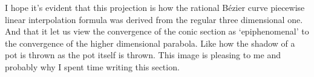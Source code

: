 I hope it's evident that this projection is how the rational Bézier curve piecewise linear interpolation formula was derived from the regular three dimensional one.
And that it let us view the convergence of the conic section as `epiphenomenal' to the convergence of the higher dimensional parabola.
Like how the shadow of a pot is thrown as the pot itself is thrown.
This image is pleasing to me and probably why I spent time writing this section.
